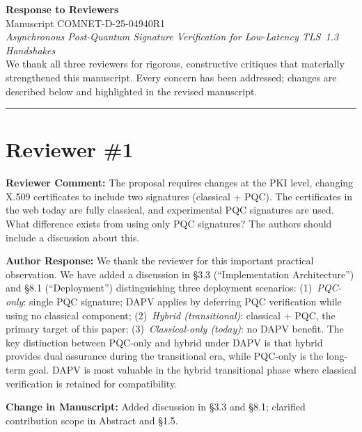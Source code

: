 \documentclass[12pt]{article}
\newcommand{\RC}[1]{\textcolor{reviewerblue}{\textbf{Reviewer Comment:}} #1}
\newcommand{\AR}[1]{\textcolor{replygreen}{\textbf{Author Response:}} #1}
\newcommand{\CH}[1]{\textcolor{changemagenta}{\textbf{Change in Manuscript:}} #1}
\begin{document}
\begin{center}
  {\Large\bfseries Response to Reviewers}\\[6pt]
  {\large Manuscript COMNET-D-25-04940R1}\\[4pt]
  {\itshape Asynchronous Post-Quantum Signature Verification for
   Low-Latency TLS~1.3 Handshakes}\\[8pt]
  We thank all three reviewers for rigorous, constructive critiques that
  materially strengthened this manuscript.  Every concern has been addressed;
  changes are described below and highlighted in the revised manuscript.
\end{center}

\vspace{1em}
\hrule
\vspace{1em}

\section*{Reviewer \#1}

\begin{reviewbox}
\RC{The proposal requires changes at the PKI level, changing X.509 certificates
to include two signatures (classical + PQC).  The certificates in the web today
are fully classical, and experimental PQC signatures are used.  What difference
exists from using only PQC signatures?  The authors should include a discussion
about this.}
\end{reviewbox}

\begin{replybox}
\AR{We thank the reviewer for this important practical observation.  We have
added a discussion in \S3.3 (``Implementation Architecture'') and \S8.1
(``Deployment'') distinguishing three deployment scenarios:
(1)~\emph{PQC-only}: single PQC signature; DAPV applies by deferring
PQC verification while using no classical component; (2)~\emph{Hybrid
(transitional)}: classical + PQC, the primary target of this paper;
(3)~\emph{Classical-only (today)}: no DAPV benefit.
The key distinction between PQC-only and hybrid under DAPV is that
hybrid provides dual assurance during the transitional era, while PQC-only
is the long-term goal.  DAPV is most valuable in the hybrid transitional
phase where classical verification is retained for compatibility.}

\CH{Added discussion in \S3.3 and \S8.1; clarified contribution scope in
Abstract and \S1.5.}
\end{replybox}
\end{document}
